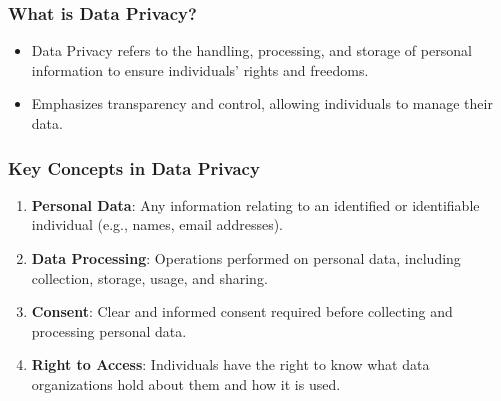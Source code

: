\documentclass[aspectratio=169]{beamer}
\begin{document}
\begin{frame}[fragile]
    \frametitle{What is Data Privacy?}
    \begin{itemize}
        \item Data Privacy refers to the handling, processing, and storage of personal information to ensure individuals' rights and freedoms.
        \item Emphasizes transparency and control, allowing individuals to manage their data.
    \end{itemize}
\end{frame}

\begin{frame}[fragile]
    \frametitle{Key Concepts in Data Privacy}
    \begin{enumerate}
        \item \textbf{Personal Data}: Any information relating to an identified or identifiable individual (e.g., names, email addresses).
        \item \textbf{Data Processing}: Operations performed on personal data, including collection, storage, usage, and sharing.
        \item \textbf{Consent}: Clear and informed consent required before collecting and processing personal data.
        \item \textbf{Right to Access}: Individuals have the right to know what data organizations hold about them and how it is used.
    \end{enumerate}
\end{frame}
\end{document}
